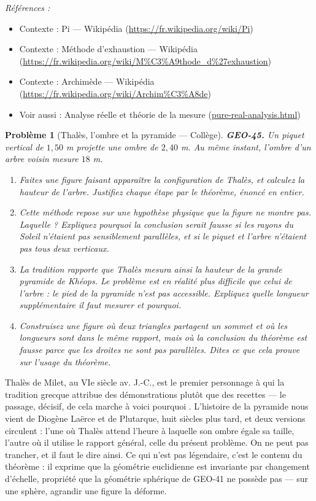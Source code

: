 \documentclass[11pt]{article}
\newtheorem{problem}{Problème}
\newenvironment{refs}{\par\small\noindent\emph{Références :}\begin{itemize}\setlength\itemsep{0pt}}{\end{itemize}\normalsize}
\begin{document}
\begin{refs}
\item Contexte : Pi --- Wikipédia (\url{https://fr.wikipedia.org/wiki/Pi})
\item Contexte : Méthode d'exhaustion --- Wikipédia (\url{https://fr.wikipedia.org/wiki/M%C3%A9thode_d%27exhaustion})
\item Contexte : Archimède --- Wikipédia (\url{https://fr.wikipedia.org/wiki/Archim%C3%A8de})
\item Voir aussi : Analyse réelle et théorie de la mesure (\url{pure-real-analysis.html})
\end{refs}

\bigskip

\begin{problem}[{Thalès, l'ombre et la pyramide --- Collège}]
\textbf{GEO-45.} Un piquet vertical de $ 1{,}50 $ m projette une ombre de $ 2{,}40 $ m. Au même
instant, l'ombre d'un arbre voisin mesure $ 18 $ m.
\begin{enumerate}
\item[(a)] Faites une figure faisant apparaître la configuration de Thalès, et calculez la hauteur de
l'arbre. Justifiez chaque étape par le théorème, énoncé en entier.
\item[(b)] Cette méthode repose sur une hypothèse physique que la figure ne montre pas. Laquelle ? Expliquez
pourquoi la conclusion serait fausse si les rayons du Soleil n'étaient pas sensiblement parallèles, et
si le piquet et l'arbre n'étaient pas tous deux verticaux.
\item[(c)] La tradition rapporte que Thalès mesura ainsi la hauteur de la grande pyramide de Khéops. Le
problème est en réalité plus difficile que celui de l'arbre : le pied de la pyramide n'est pas
accessible. Expliquez quelle longueur supplémentaire il faut mesurer et pourquoi.
\item[(d)] Construisez une figure où deux triangles partagent un sommet et où les longueurs sont dans le même
rapport, mais où la conclusion du théorème est fausse parce que les droites ne sont pas parallèles.
Dites ce que cela prouve sur l'usage du théorème.
\end{enumerate}

\end{problem}

\noindent Thalès de Milet, au VIe siècle av. J.-C., est le premier personnage à qui
la tradition grecque attribue des démonstrations plutôt que des recettes --- le passage, décisif, de
\og{} cela marche \fg{} à \og{} voici pourquoi \fg{}. L'histoire de la pyramide nous vient de Diogène Laërce et de
Plutarque, huit siècles plus tard, et deux versions circulent : l'une où Thalès attend l'heure à
laquelle son ombre égale sa taille, l'autre où il utilise le rapport général, celle du présent
problème. On ne peut pas trancher, et il faut le dire ainsi. Ce qui n'est pas légendaire, c'est le
contenu du théorème : il exprime que la géométrie euclidienne est invariante par changement d'échelle,
propriété que la géométrie sphérique de GEO-41 ne possède pas --- sur une sphère, agrandir une figure la
déforme.
\end{document}
